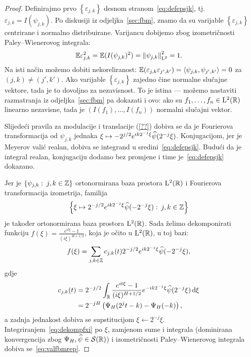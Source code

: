 \documentclass[main.tex]{subfiles}
\begin{document}
\begin{proof}
	Definirajmo prvo  \( \left\{ \varepsilon_{j,k }\right\} \) desnom stranom~\eqref{eq:defepsjk}, tj.\ \( \varepsilon_{j,k} = I(\psi_{j,k}) \).
	Po diskusiji iz odjeljka~\ref{sec:fbm}, znamo da su varijable \( \left\{ \varepsilon_{j,k} \right\} \)
	centrirane i normalno distribuirane. Varijancu dobijemo zbog izometričnosti
	Paley--Wienerovog integrala:
	\begin{equation}
		\mathbb{E}\varepsilon_{j,k}^2 = \mathbb{E}(I(\psi_{j,k})^2) = \left\lVert\psi_{j,k}\right\rVert^2_{\mathrm{L}^2} = 1.
	\end{equation}
	Na isti način možemo dobiti nekoreliranost: \( \mathbb{E} (\varepsilon_{j,k}\varepsilon_{j',k'}) = \left\langle {\psi_{j,k}}, {\psi_{j',k'}} \right\rangle = 0 \) za \( (j,k) \neq (j',k') \). Ako varijable \( \left\{ \varepsilon_{j,k}  \right\} \)
	zajedno čine normalne slučajne vektore, tada je to dovoljno za nezavisnost.
	To je istina --- možemo nastaviti razmatranja iz odjeljka~\ref{sec:fbm} pa dokazati i ovo: ako su \( f_1, \ldots, f_n \in \mathrm{L}^2(\mathbb{R}) \)
	linearno nezavisne, tada je \( \left( I(f_1),\ldots,I(f_n) \right)  \) normalni slučajni vektor.

	Slijedeći pravila za modulacije i translacije (\ref{??})
	dobiva se da je Fourierova transformacija od \( \psi_{j,k} \) jednaka
	\( \xi \mapsto -2^{j/2}e^{ik2^{-j}\xi}\widehat{\psi}(2^{-j}\xi) \).
	Konjugacijom, jer je Meyerov valić realan,
	dobiva se integrand u sredini~\eqref{eq:defepsjk}.
	Budući da je integral realan, konjugaciju dodamo bez promjene i time
	je~\eqref{eq:defepsjk} dokazano.

	Jer je \( \left\{ \psi_{j,k} \, \colon \, j,k \in \mathbb{Z} \right\} \) ortonormirana baza
	prostora \( \mathrm{L}^2(\mathbb{R}) \) i Fourierova transformacija izometrija, familija
	\[
		\left\{ \xi \mapsto 2^{-j/2} e^{ik2^{-j}\xi}\widehat{\psi}(-2^{-j}\xi) \, \colon \, j,k \in \mathbb{Z} \right\}
	\]
	je također ortonormirana baza prostora \( \mathrm{L}^2(\mathbb{R}) \). Sada želimo dekomponirati
	funkciju \( f(\xi) = \frac{e^{it\xi}-1}{(i\xi)^{H+1/2}} \), koja je očito u \( \mathrm{L}^2(\mathbb{R}) \), u toj bazi:
	\begin{equation} \label{eq:dekompfxi}
		f(\xi) =
		\sum_{j,k \in \mathbb{Z}} c_{j,k}(t) 2^{-j/2}e^{ik2^{-j}\xi}\widehat{\psi}(-2^{-j}\xi),
	\end{equation}
	gdje
	\begin{equation}
		\begin{aligned}
			c_{j,k}(t) & = 2^{-j/2} \int_{\mathbb{R}} \frac{e^{it\xi}-1}{(i\xi)^{H+1/2}}e^{-ik2^{-j}\xi}\widehat{\psi}(2^{-j}\xi) \,\mathrm d \xi
			\\ &= 2^{-jH} \left( \Psi_H(2^jt-k)-\Psi_H(-k) \right),
		\end{aligned}
	\end{equation}
	a zadnja jednakost dobiva se supstitucijom \( \xi \leftarrow 2^{-j}\xi \).
	Integriranjem~\eqref{eq:dekompfxi} po \( \xi \), zamjenom sume i integrala (dominirana konvergencija zbog \( \Psi_H, \widehat{\psi} \in \mathcal S(\mathbb{R}) \)) i izometričnosti Paley--Wienerovog integrala
	dobiva se~\eqref{eq:valfbmrep}.


\end{proof}
\end{document}

